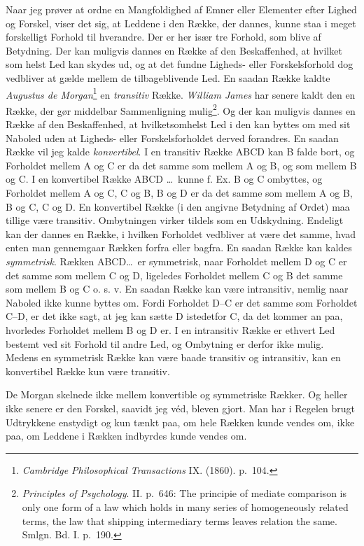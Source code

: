 \documentclass[12pt,a4paper]{book}
\newcommand{\opage}[1]{\marginnote{\footnotesize\textit{[#1]}}}
\begin{document}
Naar jeg prøver at ordne en Mangfoldighed af Emner eller Elementer efter
Lighed og Forskel, viser det sig, at Leddene i den Række, der dannes, kunne
staa i meget forskelligt Forhold til hverandre. Der er her især tre Forhold,
som blive af Betydning. Der kan muligvis dannes en Række af den Beskaffenhed,
at hvilket som helst Led kan skydes ud, og at det fundne Ligheds- eller
Forskelsforhold dog vedbliver at gælde mellem de tilbageblivende Led. En
saadan Række kaldte \emph{Augustus de Morgan}\footnote{\emph{Cambridge Philosophical Transactions} IX. (1860). p.~104.} en \emph{transitiv}
Række. \emph{William James} har senere kaldt den en Række, der gør middelbar
Sammenligning mulig\footnote{\emph{Principles of Psychology}. II. p.~646: The principie of mediate comparison is only one form of a law which holds in many series of homogeneously related terms, the law that shipping intermediary terms leaves relation the same. Smlgn. Bd. I. p.~190.}. Og der kan muligvis dannes en Række af den
Beskaffenhed, at hvilketsomhelst Led i den kan byttes om med sit Naboled uden
at Ligheds- eller Forskelsforholdet derved forandres. En saadan Række vil jeg
kalde \emph{konvertibel}. I en transitiv Række ABCD kan B falde bort, og
Forholdet mellem A og C er da det samme som mellem A og B, og som mellem B og
C. I en konvertibel Række ABCD \ldots\ kunne f. Ex. B og C ombyttes, og
Forholdet mellem A og C, C og B, B og D er da det samme som mellem A og B, B og
C, C og D. En konvertibel Række (i den angivne Betydning af Ordet) maa tillige
være transitiv. Ombytningen virker tildels som en Udskydning. Endeligt kan der
dannes en Række, i hvilken Forholdet vedbliver at være det samme, hvad enten
man gennemgaar Rækken forfra eller bagfra. En saadan Række kan kaldes
\emph{symmetrisk}. Rækken ABCD\ldots\ er symmetrisk, naar Forholdet mellem D og
C er det samme som mellem C og D, ligeledes Forholdet mellem C og \opage{164} B det samme
som mellem B og C o. s. v. En saadan Række kan være intransitiv, nemlig naar
Naboled ikke kunne byttes om. Fordi Forholdet D--C er det samme som Forholdet
C--D, er det ikke sagt, at jeg kan sætte D istedetfor C, da det kommer an paa,
hvorledes Forholdet mellem B og D er. I en intransitiv Række er ethvert Led
bestemt ved sit Forhold til andre Led, og Ombytning er derfor ikke mulig.
Medens en symmetrisk Række kan være baade transitiv og intransitiv, kan en
konvertibel Række kun være transitiv.

De Morgan skelnede ikke mellem konvertible og symmetriske Rækker. Og heller
ikke senere er den Forskel, saavidt jeg véd, bleven gjort. Man har i Regelen
brugt Udtrykkene enstydigt og kun tænkt paa, om hele Rækken kunde vendes om,
ikke paa, om Leddene i Rækken indbyrdes kunde vendes om.
\end{document}
